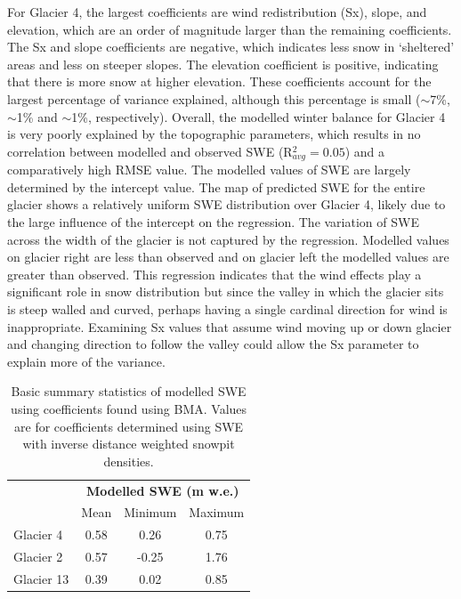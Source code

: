 \documentclass[12pt]{article}
\begin{document}
For Glacier 4, the largest coefficients are wind redistribution (Sx), slope, and elevation, which are an order of magnitude larger than the remaining coefficients. The Sx and slope coefficients are negative, which indicates less snow in `sheltered' areas and less on steeper slopes. The elevation coefficient is positive, indicating that there is more snow at higher elevation. These coefficients account for the largest percentage of variance explained, although this percentage is small ($\sim$7\%, $\sim$1\% and $\sim$1\%, respectively). Overall, the modelled winter balance for Glacier 4 is very poorly explained by the topographic parameters, which results in no correlation between modelled and observed SWE (R$^2_{avg}=0.05$) and a comparatively high RMSE value. The modelled values of SWE are largely determined by the intercept value. The map of predicted SWE for the entire glacier shows a relatively uniform SWE distribution over Glacier 4, likely due to the large influence of the intercept on the regression. The variation of SWE across the width of the glacier is not captured by the regression. Modelled values on glacier right are less than observed and on glacier left the modelled values are greater than observed. This regression indicates that the wind effects play a significant role in snow distribution but since the valley in which the glacier sits is steep walled and curved, perhaps having a single cardinal direction for wind is inappropriate. Examining Sx values that assume wind moving up or down glacier and changing direction to follow the valley could allow the Sx parameter to explain more of the variance. 
\begin{table}
\centering
\caption{Basic summary statistics of modelled SWE using coefficients found using BMA. Values are for coefficients determined using SWE with inverse distance weighted snowpit densities. }
\label{tab:BMSsweMinMax}
\begin{tabular}{lccc}
\multicolumn{1}{l}{} & \multicolumn{3}{c}{\textbf{Modelled SWE (m w.e.)}} \\
                     & Mean          & Minimum          & Maximum         \\ \hline
Glacier 4            & 0.58          & 0.26             & 0.75            \\
Glacier 2            & 0.57          & -0.25            & 1.76            \\
Glacier 13           & 0.39          & 0.02             & 0.85           
\end{tabular}
\end{table} 
\end{document}
